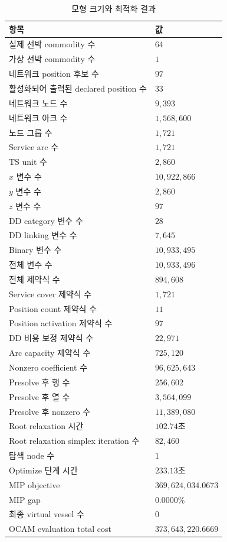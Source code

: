 \documentclass[11pt]{article}
\begin{document}
\begin{table}[ht]
\centering
\caption{모형 크기와 최적화 결과}
\begin{tabular}{@{}ll@{}}
\toprule
항목 & 값 \\
\midrule
실제 선박 commodity 수 & $64$ \\
가상 선박 commodity 수 & $1$ \\
네트워크 position 후보 수 & $97$ \\
활성화되어 출력된 declared position 수 & $33$ \\
네트워크 노드 수 & $9{,}393$ \\
네트워크 아크 수 & $1{,}568{,}600$ \\
노드 그룹 수 & $1{,}721$ \\
Service arc 수 & $1{,}721$ \\
TS unit 수 & $2{,}860$ \\
$x$ 변수 수 & $10{,}922{,}866$ \\
$y$ 변수 수 & $2{,}860$ \\
$z$ 변수 수 & $97$ \\
DD category 변수 수 & $28$ \\
DD linking 변수 수 & $7{,}645$ \\
Binary 변수 수 & $10{,}933{,}495$ \\
전체 변수 수 & $10{,}933{,}496$ \\
전체 제약식 수 & $894{,}608$ \\
Service cover 제약식 수 & $1{,}721$ \\
Position count 제약식 수 & $11$ \\
Position activation 제약식 수 & $97$ \\
DD 비용 보정 제약식 수 & $22{,}971$ \\
Arc capacity 제약식 수 & $725{,}120$ \\
Nonzero coefficient 수 & $96{,}625{,}643$ \\
Presolve 후 행 수 & $256{,}602$ \\
Presolve 후 열 수 & $3{,}564{,}099$ \\
Presolve 후 nonzero 수 & $11{,}389{,}080$ \\
Root relaxation 시간 & $102.74$초 \\
Root relaxation simplex iteration 수 & $82{,}460$ \\
탐색 node 수 & $1$ \\
Optimize 단계 시간 & $233.13$초 \\
MIP objective & $369{,}624{,}034.0673$ \\
MIP gap & $0.0000\%$ \\
최종 virtual vessel 수 & $0$ \\
OCAM evaluation total cost & $373{,}643{,}220.6669$ \\
\bottomrule
\end{tabular}
\label{tab:current-artifact}
\end{table}
\end{document}
